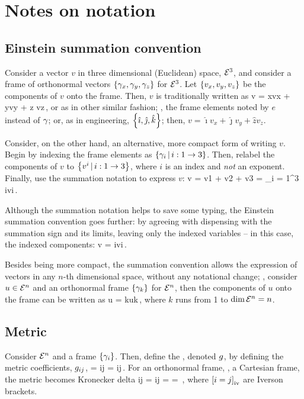 \section{Notes on notation}

\subsection{Einstein summation convention}
Consider a vector $v$ in three dimensional (Euclidean) space, $\mathcal{\mathcal{E}}^{3}$, and consider a frame of orthonormal vectors $\left\lbrace{\gamma_{x}, \gamma_{y}, \gamma_{z}}\right\rbrace$ for $\mathcal{\mathcal{E}}^{3}$. Let $\left\lbrace{{v}_{x}, {v}_{y}, {v}_{z}}\right\rbrace$ be the components of $v$ onto the frame. Then, $v$ is traditionally written as
\beq
v = \fbvec x\rvec vx + \fbvec y\rvec vy + \fbvec z \rvec vz\,,
\eeq
or as in other similar fashion; \eg, the frame elements noted by $e$ instead of $\gamma_{}$; or, as in engineering, $\left\lbrace{\hat\imath, \hat\jmath, \hat k}\right\rbrace$; then, $v = \hat{\imath}v_x + \hat{\jmath}v_y + \hat{z}v_z$.

Consider, on the other hand, an alternative, more compact form of writing $v$. Begin by indexing the frame elements as $\left\lbrace{{\gamma_{i}}\,|\,{i:1\to 3}}\right\rbrace$. Then, relabel the components of $v$ to $\left\lbrace{{{v}^{i}}\,|\,{i:1\to 3}}\right\rbrace$, where $i$ is an index and \emph{not} an exponent. Finally, use the summation notation to express $v$:
\beq
v = \fvec v1 + \fvec v2 + \fvec v3 
  = \sum_{i = 1}^3 \fbvec i\fvec vi\,.
\eeq

Although the summation notation helps to save some typing, the Einstein summation convention goes further: by agreeing with dispensing with the summation sign and its limits, leaving only the indexed variables -- in this case, the indexed components:
\beq
v = \fbvec i\fvec vi\,.
\eeq

Besides being more compact, the summation convention allows the expression of vectors in any $n$-th dimensional space, without any notational change; \eg, consider $u\in\mathcal{\mathcal{E}}^{n}$ and an orthonormal frame $\left\lbrace{\gamma_{k}}\right\rbrace$ for $\mathcal{\mathcal{E}}^{n}$, then the components of $u$ onto the frame can be written as
\beq
u = \fbvec k\fvec uk\,,
\eeq
where $k$ runs from 1 to $\dim\mathcal{\mathcal{E}}^{n} = n$.


\subsection{Metric}
Consider $\mathcal{\mathcal{E}}^{n}$ and a frame $\left\lbrace{\gamma_{i}}\right\rbrace$. Then, define the , denoted $g$, by defining the metric coefficients, $g_{{i}{j}}$,
\beq
\met = \fmet ij = \fbvec i\iprod\fbvec j\,.
\eeq
For an orthonormal frame, \eg, a Cartesian frame, the metric becomes Kronecker delta
\beq
\fmet ij = \fkron ij =  = \diag{}\,,
\eeq
where $\left[i = j\right]_\text{iv}$ are Iverson brackets.


